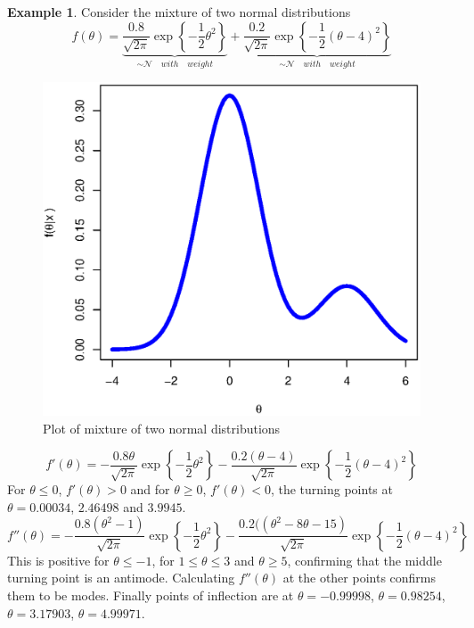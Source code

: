 \documentclass[lecture,12pt,]{pcms-l}
\numberwithin{section}{chapter}
\numberwithin{equation}{chapter}
\theoremstyle{plain}
\theoremstyle{definition}
\newtheorem{example}{Example}[section]
\theoremstyle{definition}
\begin{document}
\begin{example}
Consider the mixture of two normal distributions
\begin{equation}
f(\theta)=\underbrace{\frac{0.8}{\sqrt{2 \pi}} \exp \left \{-\frac{1}{2} \theta^2 \right \}}_{\sim \mathcal{N} \quad with \quad weight}+ \underbrace{\frac{0.2}{\sqrt{2 \pi}} \exp \left \{-\frac{1}{2} (\theta-4)^2 \right \}}_{\sim \mathcal{N} \quad with \quad weight}
\end{equation}

\begin{figure}[h!]
 \includegraphics[scale=0.4]{MixGauss}%
  \caption{Plot of mixture of two normal distributions }
\label{fig:posterior}
\end{figure}

\begin{equation}
f'(\theta)=-\frac{0.8 \theta}{\sqrt{2 \pi}} \exp \left \{-\frac{1}{2} \theta^2 \right \}-\frac{0.2(\theta -4)}{\sqrt{2 \pi}} \exp \left \{-\frac{1}{2} (\theta-4)^2 \right \}
\end{equation}
For $\theta \leq 0$, $f'(\theta)>0$ and for $\theta \geq 0$, $f'(\theta)<0$, the turning points at $\theta=0.00034$, $2.46498$ and $3.9945$.
\begin{equation}
f''(\theta)=-\frac{0.8 (\theta^2-1)}{\sqrt{2 \pi}} \exp \left \{-\frac{1}{2} \theta^2 \right \}-\frac{0.2((\theta^2-8\theta -15)}{\sqrt{2 \pi}} \exp \left \{-\frac{1}{2} (\theta-4)^2 \right \}
\end{equation}
This is positive for $\theta \leq -1$, for $1 \leq \theta \leq 3$ and $\theta \geq 5$, confirming that the middle turning point is an antimode. Calculating $f''(\theta)$ at the other points confirms them to be modes. Finally points of inflection are at $\theta = -0.99998$, $\theta = 0.98254$, $\theta = 3.17903$, $\theta = 4.99971$. 
\end{example}
\end{document}
